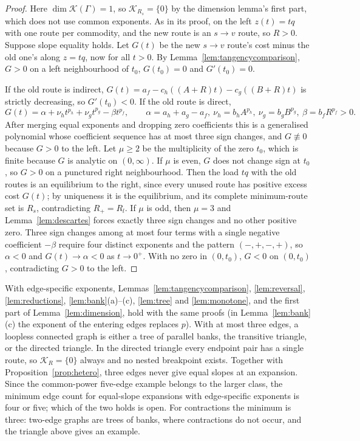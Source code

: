 \begin{proof}
Here $\dim\mathcal K(\Gamma)=1$, so $\mathcal K_{R_s}=\{0\}$ by the dimension
lemma's first part, which does not use common exponents. As in its proof, on
the left $z(t)=tq$ with one route per commodity, and the new route is an
$s\to v$ route, so $R>0$. Suppose slope equality holds. Let $G(t)$ be the new
$s\to v$ route's cost minus the old one's along $z=tq$, now for all $t>0$. By
Lemma~\ref{lem:tangencycomparison}, $G>0$ on a left neighbourhood of $t_0$,
$G(t_0)=0$ and $G'(t_0)=0$.

If the old route is indirect,
$G(t)=a_f-c_h((A+R)t)-c_g((B+R)t)$ is strictly decreasing, so $G'(t_0)<0$.
If the old route is direct,
\[
 G(t)=\alpha+\nu_ht^{p_h}+\nu_gt^{p_g}-\beta t^{p_f},\qquad
 \alpha=a_h+a_g-a_f,\ \nu_h=b_hA^{p_h},\ \nu_g=b_gB^{p_g},\
 \beta=b_fR^{p_f}>0 .
\]
After merging equal exponents and dropping zero coefficients this is a
generalised polynomial whose coefficient sequence has at most three sign
changes, and $G\not\equiv0$ because $G>0$ to the left. Let $\mu\ge2$ be the
multiplicity of the zero $t_0$, which is finite because $G$ is analytic on
$(0,\infty)$. If $\mu$ is even, $G$ does not change sign at $t_0$, so $G>0$ on
a punctured right neighbourhood. Then the load $tq$ with the old routes is an
equilibrium to the right, since every unused route has positive excess cost
$G(t)$; by uniqueness it is the equilibrium, and its complete minimum-route
set is $R_s$, contradicting $R_+=R_l$. If $\mu$ is odd, then $\mu=3$ and
Lemma~\ref{lem:descartes} forces exactly three sign changes and no other
positive zero. Three sign changes among at most four terms with a single
negative coefficient $-\beta$ require four distinct exponents and the
pattern $(-,+,-,+)$, so $\alpha<0$ and $G(t)\to\alpha<0$ as $t\to0^+$. With no
zero in $(0,t_0)$, $G<0$ on $(0,t_0)$, contradicting $G>0$ to the left.
\end{proof}

\begin{remark}\label{rem:hetero}
With edge-specific exponents, Lemmas~\ref{lem:tangencycomparison}, \ref{lem:reversal},
\ref{lem:reductions}, \ref{lem:bank}(a)--(c), \ref{lem:tree} and
\ref{lem:monotone}, and the first part of Lemma~\ref{lem:dimension}, hold
with the same proofs (in Lemma~\ref{lem:bank}(c) the exponent of the entering
edges replaces $p$). With at most three edges, a loopless connected graph is
either a tree of parallel banks, the transitive triangle, or the directed
triangle. In the directed triangle every endpoint pair has a single route, so
$\mathcal K_R=\{0\}$ always and no nested breakpoint exists. Together with
Proposition~\ref{prop:hetero}, three edges never give equal slopes at an
expansion. Since the common-power five-edge example belongs to the larger
class, the minimum edge count for equal-slope expansions with edge-specific
exponents is four or five; which of the two holds is open. For contractions
the minimum is three: two-edge graphs are trees of banks, where contractions
do not occur, and the triangle above gives an example.
\end{remark}
